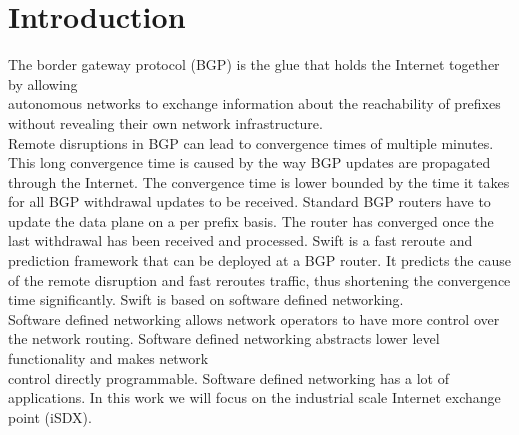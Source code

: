 

\chapter{\label{introduction}Introduction}
The border gateway protocol (BGP) is the glue that holds the Internet together by allowing \\
autonomous networks to exchange information about the reachability of prefixes without revealing their own network infrastructure. \\
Remote disruptions in BGP can lead to convergence times of multiple minutes. This long convergence time is caused by the way BGP updates are propagated through the Internet. The convergence time is lower bounded by the time it takes for all BGP withdrawal updates to be received. Standard BGP routers have to update the data plane on a per prefix basis. The router has converged once the last withdrawal has been received and processed. Swift is a fast reroute and prediction framework that can be deployed at a BGP router. It predicts the cause of the remote disruption and fast reroutes traffic, thus shortening the convergence time significantly. Swift is based on software defined networking. \\
Software defined networking allows network operators to have more control over the network routing. Software defined networking abstracts lower level functionality and makes network\\
control directly programmable. Software defined networking has a lot of applications. In this work we will focus on the industrial scale Internet exchange point (iSDX). 

